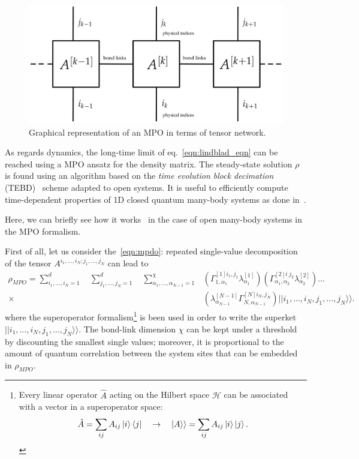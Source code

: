 \begin{figure}[H]
    \centering
    \includegraphics[scale=0.4]{Figures/mpo_graphical.png}
    \captionsetup{width=1.\linewidth}
    \caption{Graphical representation of an MPO in terms of tensor network.}
    \label{fig:mpo_graphical}
\end{figure}

As regards dynamics, the long-time limit of eq.~\ref{eqn:lindblad_eqn} can be reached using a MPO ansatz for the density matrix. The steady-state solution $\rho$ is found using an algorithm based on the \emph{time evolution block decimation} (TEBD)~\cite{PhysRevLett.91.147902} scheme adapted to open systems. It is useful to efficiently compute time-dependent properties of 1D closed quantum many-body systems as done in~\cite{PhysRevLett.93.040502}. 

Here, we can briefly see how it works~\cite{jin_biella_ross} in the case of open many-body systems in the MPO formalism. 

First of all, let us consider the~\ref{eqn:mpdo}: repeated single-value decomposition of the tensor $A^{i_1,\dots, i_N; j_1,\dots, j_N}$ can lead to
\begin{equation*}
\label{mpo_ansatz}
\begin{split}
    \rho_{MPO} = \sum_{i_1, \dots ,i_N = 1}^{d}\quad \sum_{j_1, \dots ,j_N = 1}^{d}\quad \sum_{\alpha_1,\dots, \alpha_{N-1} = 1}^\chi &(\Gamma_{1, \alpha_1}^{[1]i_1, j_1}\lambda_{\alpha_1}^{[1]})(\Gamma_{\alpha_1, \alpha_2}^{[2]i_, j_2}\lambda_{\alpha_2}^{[2]}) \dots \\  \times &(\lambda_{\alpha_{N-1}}^{[N-1]}\Gamma_{N, \alpha_{N-1}}^{[N]i_N, j_N}) ||i_1, \dots ,i_N, j_1, \dots ,j_N\rangle\rangle.
    \end{split}
\end{equation*}
where the superoperator formalism\footnote{Every linear operator $\hat{A}$ acting on the Hilbert space $\mathcal{H}$ can be associated with a vector in a superoperator space:
\begin{equation*}
    \hat{A} = \sum_{ij} A_{ij} \ket{i}\bra{j} \quad \rightarrow \quad |A\rangle\rangle = \sum_{ij} A_{ij} \ket{i}\ket{j}.
\end{equation*}} is been used in order to write the superket \\$||i_1, \dots ,i_N, j_1, \dots ,j_N\rangle\rangle$. The bond-link dimension $\chi$ can be kept under a threshold by discounting the smallest single values; moreover, it is proportional to the amount of quantum correlation between the system sites that can be embedded in $\rho_{MPO}$.

